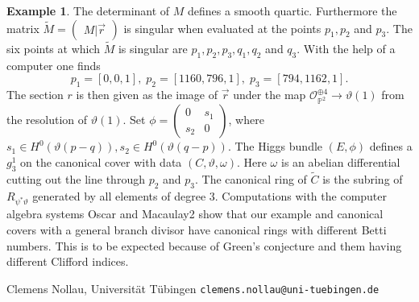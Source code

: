 \documentclass[12pt]{extarticle}
\theoremstyle{definition}
\newtheorem{example}[theorem]{Example}
\numberwithin{theorem}{section}
\newcommand{\PP}{\mathbb{P}}
\newcommand{\OO}{\mathcal{O}}
\renewcommand{\tilde}{\widetilde}		%
\begin{document}
\begin{example}
The determinant of $M$ defines a smooth quartic. Furthermore the matrix $\tilde{M} = \begin{pmatrix}
M  |\vec{r}
\end{pmatrix}$ is singular when evaluated at the points $p_1,p_2$ and $p_3$. The six points at which $\tilde{M}$ is singular are $p_1,p_2,p_3,q_1,q_2$ and $q_3$. With the help of a computer one finds
\begin{equation*}
p_1 = [0,0,1],\; p_2 = [1160,796,1] ,\; p_3 = [794,1162,1].
\end{equation*} 
The section $r$ is then given as the image of $\vec{r}$ under the map $\OO_{\PP^2}^{\oplus 4} \rightarrow \vartheta(1)$ from the resolution of $\vartheta(1)$. 
Set $\phi = \begin{pmatrix} 0 & s_1 
\\ s_2 & 0 \end{pmatrix}$, where $s_1 \in H^0(\vartheta(p -q)), s_2 \in H^0(\vartheta(q-p))$. The Higgs bundle $(E,\phi)$ defines a $g^1_3$ on the canonical cover with data $(C, \vartheta,\omega)$. Here $\omega$ is an abelian differential cutting out the line through $p_2$ and $p_3$. The canonical ring of $\tilde{C}$ is the subring of $R_{\psi^*\vartheta}$ generated by all elements of degree $3$. Computations with the computer algebra systems Oscar \cite{OSCAR} and Macaulay2 \cite{M2} show that our example and canonical covers with a general branch divisor have canonical rings with different Betti numbers. This is to be expected because of Green's conjecture and them having different Clifford indices.    
\end{example}

 

\noindent Clemens Nollau,
Universit\"at T\"ubingen
\hfill {\tt clemens.nollau@uni-tuebingen.de}
\end{document}

